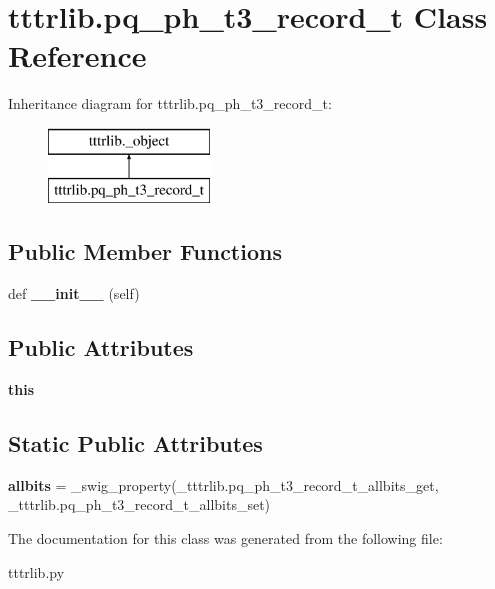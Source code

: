 \hypertarget{classtttrlib_1_1pq__ph__t3__record__t}{}\section{tttrlib.\+pq\+\_\+ph\+\_\+t3\+\_\+record\+\_\+t Class Reference}
\label{classtttrlib_1_1pq__ph__t3__record__t}
Inheritance diagram for tttrlib.\+pq\+\_\+ph\+\_\+t3\+\_\+record\+\_\+t\+:\begin{figure}[H]
\begin{center}
\leavevmode
\includegraphics[height=2.000000cm]{classtttrlib_1_1pq__ph__t3__record__t}
\end{center}
\end{figure}
\subsection*{Public Member Functions}
\begin{DoxyCompactItemize}
\item 
\mbox{\label{classtttrlib_1_1pq__ph__t3__record__t_a5b555378ee271af2e9c0caeb8e7c8ffc}} 
def {\bfseries \+\_\+\+\_\+init\+\_\+\+\_\+} (self)
\end{DoxyCompactItemize}
\subsection*{Public Attributes}
\begin{DoxyCompactItemize}
\item 
\mbox{\label{classtttrlib_1_1pq__ph__t3__record__t_a99998dfd836ed0909d7bd627d9508d68}} 
{\bfseries this}
\end{DoxyCompactItemize}
\subsection*{Static Public Attributes}
\begin{DoxyCompactItemize}
\item 
\mbox{\label{classtttrlib_1_1pq__ph__t3__record__t_af0122534ca0916684e5a06a03b83e1e6}} 
{\bfseries allbits} = \+\_\+swig\+\_\+property(\+\_\+tttrlib.\+pq\+\_\+ph\+\_\+t3\+\_\+record\+\_\+t\+\_\+allbits\+\_\+get, \+\_\+tttrlib.\+pq\+\_\+ph\+\_\+t3\+\_\+record\+\_\+t\+\_\+allbits\+\_\+set)
\end{DoxyCompactItemize}


The documentation for this class was generated from the following file\+:\begin{DoxyCompactItemize}
\item 
tttrlib.\+py\end{DoxyCompactItemize}
